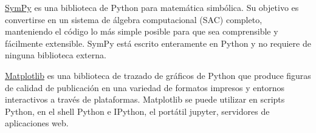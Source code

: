 \href{http://www.sympy.org/}{SymPy}
es una biblioteca de Python para matemática simbólica. Su objetivo es convertirse en 
un sistema de álgebra computacional (SAC) completo, manteniendo el código lo más simple 
posible para que sea comprensible y fácilmente extensible. SymPy está escrito enteramente 
en Python y no requiere de ninguna biblioteca externa.
% 
% 



\href{http://matplotlib.org/}{Matplotlib} es una biblioteca de trazado de gráficos de Python que produce figuras de calidad de publicación en una variedad de formatos impresos y entornos interactivos a través de plataformas. Matplotlib se puede utilizar en scripts Python, en el shell Python e IPython, el portátil jupyter, servidores de aplicaciones web.






% 
% 
% 
% 


